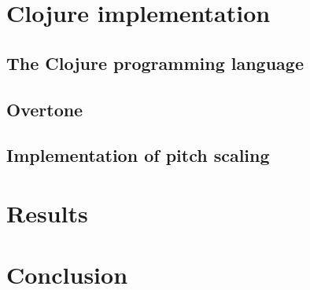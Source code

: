 \documentclass[letterpaper]{article}
\begin{document}
\section{Clojure implementation}
\subsection{The Clojure programming language}
\subsection{Overtone}
\subsection{Implementation of pitch scaling}

\section{Results}
\section{Conclusion}

\footnotesize


\end{document}
